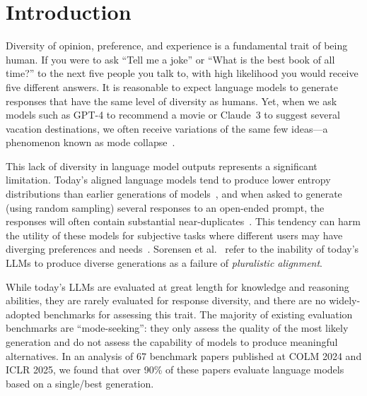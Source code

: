 
\section{Introduction}
\label{sec-introduction}
Diversity of opinion, preference, and experience is a fundamental trait of being human.
If you were to ask ``Tell me a joke'' or ``What is the best book of all time?'' to the next five people you talk to, with high likelihood you would receive five different answers.
It is reasonable to expect language models to generate responses that have the same level of diversity as humans.
Yet, when we ask models such as GPT-4 to recommend a movie or Claude~3 to suggest several vacation destinations, we often receive variations of the same few ideas---a phenomenon known as mode collapse~\cite{hamilton2024}.


This lack of diversity in language model outputs represents a significant limitation.
Today's aligned language models tend to produce lower entropy distributions than earlier generations of models~\cite{zhang2024diffuse}, and when asked to generate (using random sampling) several responses to an open-ended prompt, the responses will often contain substantial near-duplicates~\cite{omahony2024}.
This tendency can harm the utility of these models for subjective tasks where different users may have diverging preferences and needs~\cite{zhang2024diverging}.
Sorensen et al.~\cite{sorensen2024} refer to the inability of today's LLMs to produce diverse generations as a failure of \emph{pluralistic alignment}.

While today's LLMs are evaluated at great length for knowledge and reasoning abilities, they are rarely evaluated for response diversity, and there are no widely-adopted benchmarks for assessing this trait.
The majority of existing evaluation benchmarks are ``mode-seeking'': they only assess the quality of the most likely generation and do not assess the capability of models to produce meaningful alternatives.
In an analysis of 67 benchmark papers published at COLM 2024 and ICLR 2025, we found that over 90\% of these papers evaluate language models based on a single/best generation.


